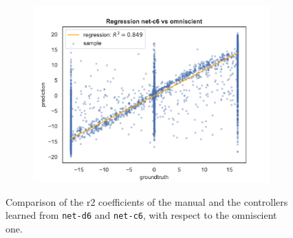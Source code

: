 \begin{figure}[!htb]
\begin{center}
\begin{subfigure}[h]{0.49\textwidth}
		\end{subfigure}
	\end{center}
	\vspace{-0.5cm}
	\begin{center}
		\begin{subfigure}[h]{0.49\textwidth}
			\includegraphics[width=\textwidth]{contents/images/net-c6/regression-net-c6-vs-omniscient}
		\end{subfigure}
	\end{center}
	\vspace{-0.5cm}
	\caption[Evaluation of the \gls{r2} coefficients of \texttt{net-c6}.]{Comparison 
		of the \gls{r2} coefficients of the manual and the controllers learned from 
		\texttt{net-d6} and \texttt{net-c6}, with respect to the omniscient one.}
	\label{fig:net-c6r2}
\end{figure}

